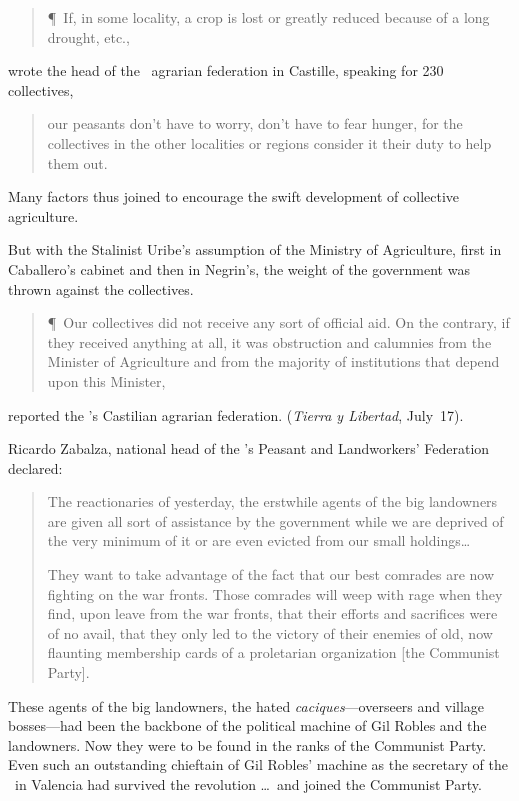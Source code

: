 \medskip

\begin{quotation}
  \P\ If, in some locality, a crop is lost or greatly reduced because of a long drought, etc.,
\end{quotation}
wrote the head of the \CNT\ agrarian federation in Castille, speaking for 230 collectives,

\begin{quotation}
  \noindent
  our peasants don’t have to worry, don’t have to fear hunger, for the collectives in the other localities or regions consider it their duty to help them out.
\end{quotation}

Many factors thus joined to encourage the swift development of collective agriculture.

But with the Stalinist Uribe’s assumption of the Ministry of Agriculture, first in Caballero’s cabinet and then in Negrin’s, the weight of the government was thrown against the collectives.

\medskip

\begin{quotation}
  \P\ Our collectives did not receive any sort of official aid. On the contrary, if they received anything at all, it was obstruction and calumnies from the Minister of Agriculture and from the majority of institutions that depend upon this Minister,
\end{quotation}
reported the \CNT’s Castilian agrarian federation. (\emph{Tierra y Libertad}, July~17).

\medskip

Ricardo Zabalza, national head of the \UGT’s Peasant and Landworkers’ Federation declared:
\begin{quotation}
  The reactionaries of yesterday, the erstwhile agents of the big landowners are given all sort of assistance by the government while we are deprived of the very minimum of it or are even evicted from our small holdings\dots
  
  They want to take advantage of the fact that our best comrades are now fighting on the war fronts. Those comrades will weep with rage when they find, upon leave from the war fronts, that their efforts and sacrifices were of no avail, that they only led to the victory of their enemies of old, now flaunting membership cards of a proletarian organization [the Communist Party].
\end{quotation}

These agents of the big landowners, the hated \emph{caciques}---overseers and village bosses---had been the backbone of the political machine of Gil Robles and the landowners. Now they were to be found in the ranks of the Communist Party. Even such an outstanding chieftain of Gil Robles’ machine as the secretary of the \CEDA\ in Valencia had survived the revolution \dots\ and joined the Communist Party.

